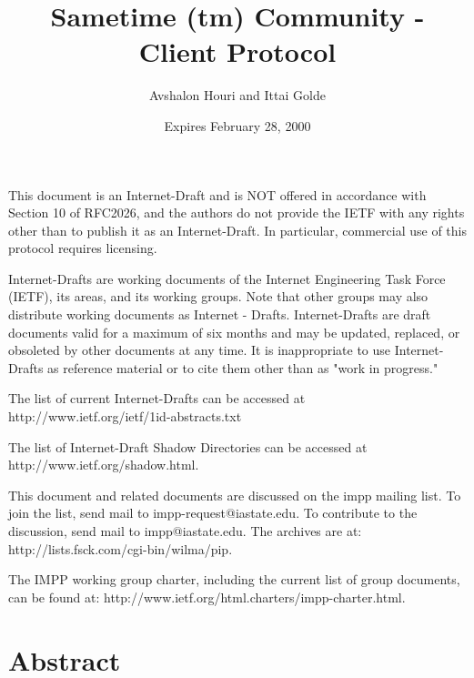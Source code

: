 \documentclass[titlepage,oneside]{book}
\begin{document}
\title{Sametime (tm) Community - Client Protocol}

\author{Avshalon Houri and Ittai Golde}

\date{Expires February 28, 2000}

\maketitle{}

\tableofcontents{}

\par{} This document is an Internet-Draft and is NOT
offered in accordance with Section 10 of RFC2026, and the authors do
not provide the IETF with any rights other than to publish it as an
Internet-Draft. In particular, commercial use of this protocol
requires licensing.

\par{} Internet-Drafts are working documents of the Internet
Engineering Task Force (IETF), its areas, and its working groups.
Note that other groups may also distribute working documents as
Internet - Drafts. Internet-Drafts are draft documents valid for a
maximum of six months and may be updated, replaced, or obsoleted by
other documents at any time. It is inappropriate to use
Internet-Drafts as reference material or to cite them other than as
"work in progress."

\par{} The list of current Internet-Drafts can be accessed at
\subpar{} http://www.ietf.org/ietf/1id-abstracts.txt

\par{} The list of Internet-Draft Shadow Directories can be accessed
at
\subpar{}http://www.ietf.org/shadow.html.

\par{} This document and related documents are discussed on the impp
mailing list. To join the list, send mail to impp-request@iastate.edu.
To contribute to the discussion, send mail to impp@iastate.edu.  The
archives are at:
\subpar{} http://lists.fsck.com/cgi-bin/wilma/pip.

\par{} The IMPP working group charter, including the current list of
group documents, can be found at:
\subpar{} http://www.ietf.org/html.charters/impp-charter.html.

\chapter{Abstract}
\end{document}
